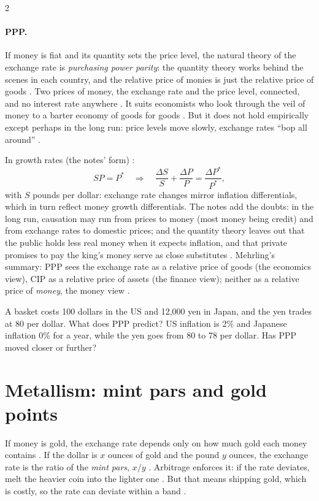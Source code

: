 \begin{paracol}{2}
\paragraph{PPP.} If money is fiat and its quantity sets the price level, the natural theory of the exchange rate is \emph{purchasing power parity}: the quantity theory works
behind the scenes in each country, and the relative price of monies is just the relative price of goods . Two prices of money, the
exchange rate and the price level, connected, and no interest rate anywhere . It suits economists who look through the veil of money to a barter economy of
goods for goods . But it does not hold empirically except perhaps in the long run: price levels move slowly, exchange rates ``bop all around''
.

In growth rates (the notes' form) :
\[
  SP = P^\ast \quad\Longrightarrow\quad \frac{\Delta S}{S} + \frac{\Delta P}{P} = \frac{\Delta P^\ast}{P^\ast},
\]
with $S$ pounds per dollar: exchange rate changes mirror inflation differentials, which in turn reflect money growth differentials. The notes add the doubts: in the long run, causation may
run from prices to money (most money being credit) and from exchange rates to domestic prices; and the quantity theory leaves out that the public holds less real money when it expects
inflation, and that private promises to pay the king's money serve as close substitutes . Mehrling's summary: PPP sees the exchange rate as a relative price of goods (the
economics view), CIP as a relative price of assets (the finance view); neither as a relative price of \emph{money}, the money view .

\begin{exercise}[PPP]
A basket costs 100 dollars in the US and 12{,}000 yen in Japan, and the yen trades at 80 per dollar. What does PPP predict? US inflation is 2\% and Japanese inflation 0\% for a
year, while the yen goes from 80 to 78 per dollar. Has PPP moved closer or further?
\end{exercise}

\section{Metallism: mint pars and gold points}\label{sec:cm-metallist}

If money is gold, the exchange rate depends only on how much gold each money contains . If the dollar is $x$ ounces of gold and the pound $y$
ounces, the exchange rate is the ratio of the \emph{mint pars}, $x/y$ . Arbitrage enforces it: if the rate deviates, melt the heavier coin into the
lighter one . But that means shipping gold, which is costly, so the rate can deviate within a band .


\end{paracol}
